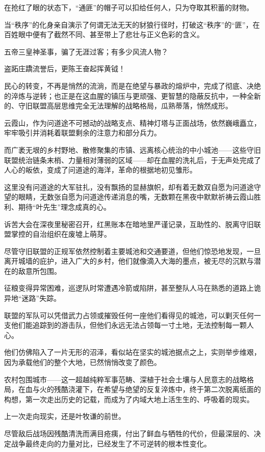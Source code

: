 在抢红了眼的状态下，“通匪”的帽子可以扣给任何人，只为夺取其积蓄的财物。

当“秩序”的化身亲自演示了何谓无法无天的豺狼行径时，打破这“秩序”的“匪”，在百姓眼中便有了截然不同、甚至带上了悲壮与正义色彩的含义。

五帝三皇神圣事，骗了无涯过客；有多少风流人物？

盗跖庄蹻流誉后，更陈王奋起挥黄钺！

\vspace{2em}

民心的转变，不再是悄然的流淌，而是在绝望与暴政的熔炉中，完成了彻底、决绝的淬炼与逆转；也正是在这血腥的镇压与更顽强、更智慧的隐蔽反抗中，一种全新的、守旧联盟高层思维完全无法理解的战略格局，瓜熟蒂落，悄然成形。

云霞山，作为问道途不可撼动的战略支点、精神灯塔与正面战场，依然巍峨矗立，牢牢吸引并消耗着联盟剩余的注意力和部分兵力。

而广袤无垠的乡村野地、散修聚集的市镇、远离核心统治的中小城池——这些守旧联盟统治链条末梢、力量相对薄弱的区域——却在血腥的洗礼后，于无声处完成了人心的皈依，变成了问道途的海洋，革命的根据地初见雏形。

这里没有问道途的大军驻扎，没有飘扬的显赫旗帜，却有着无数双自愿为问道途守望的眼睛，无数张自愿为问道途传递消息的嘴，无数颗在黑夜中默默祈祷云霞山胜利、期待“叶先生”理念成真的心。

诉苦大会在深夜里秘密召开，红黑账本在暗地里严谨记录，互助性的、脱离守旧联盟掌控的自治组织在废墟上萌芽。

尽管守旧联盟的正规军依然控制着主要城池和交通要道，但他们惊恐地发现，一旦离开城墙的庇护，进入广大的乡村，他们就像滴入大海的墨点，被无尽的沉默与潜在的敌意所包围。

征粮变得异常困难，巡逻队时常遭遇冷箭或陷阱，甚至整队人马在熟悉的道路上诡异地“迷路”失踪。

联盟的军队可以凭借武力占领或摧毁任何一座他们看得见的城池，可以剿灭任何一支他们能追踪到的游击队，但他们永远无法占领每一寸土地，无法控制每一颗人心。

他们仿佛陷入了一片无形的沼泽，看似站在坚实的城池据点之上，实则举步维艰，因为承载他们的整个大地，已然悄悄改变了颜色。

农村包围城市——这一超越纯粹军事范畴、深植于社会土壤与人民意志的战略格局，在血与火的残酷浇灌下，在希望与绝望的反复淬炼中，终于第二次脱离纸面的构想，第一次走出历史的记载，而成为了内域大地上活生生的、呼吸着的现实。

上一次走向现实，还是叶牧谦的前世。

尽管敌后战场因残酷清洗而满目疮痍，付出了鲜血与牺牲的代价，但最深层的、决定战争最终走向的力量对比，已经发生了不可逆转的根本性变化。

